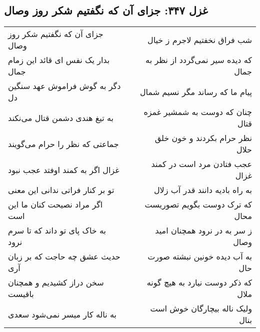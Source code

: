 \begin{center}
\section*{غزل ۳۴۷: جزای آن که نگفتیم شکر روز وصال}
\label{sec:347}
\begin{longtable}{l p{0.5cm} r}
جزای آن که نگفتیم شکر روز وصال
&&
شب فراق نخفتیم لاجرم ز خیال
\\
بدار یک نفس ای قائد این زمام جمال
&&
که دیده سیر نمی‌گردد از نظر به جمال
\\
دگر به گوش فراموش عهد سنگین دل
&&
پیام ما که رساند مگر نسیم شمال
\\
به تیغ هندی دشمن قتال می‌نکند
&&
چنان که دوست به شمشیر غمزه قتال
\\
جماعتی که نظر را حرام می‌گویند
&&
نظر حرام بکردند و خون خلق حلال
\\
غزال اگر به کمند اوفتد عجب نبود
&&
عجب فتادن مرد است در کمند غزال
\\
تو بر کنار فراتی ندانی این معنی
&&
به راه بادیه دانند قدر آب زلال
\\
اگر مراد نصیحت کنان ما این است
&&
که ترک دوست بگویم تصوریست محال
\\
به خاک پای تو داند که تا سرم نرود
&&
ز سر به در نرود همچنان امید وصال
\\
حدیث عشق چه حاجت که بر زبان آری
&&
به آب دیده خونین نبشته صورت حال
\\
سخن دراز کشیدیم و همچنان باقیست
&&
که ذکر دوست نیارد به هیچ گونه ملال
\\
به ناله کار میسر نمی‌شود سعدی
&&
ولیک ناله بیچارگان خوش است بنال
\\
\end{longtable}
\end{center}
